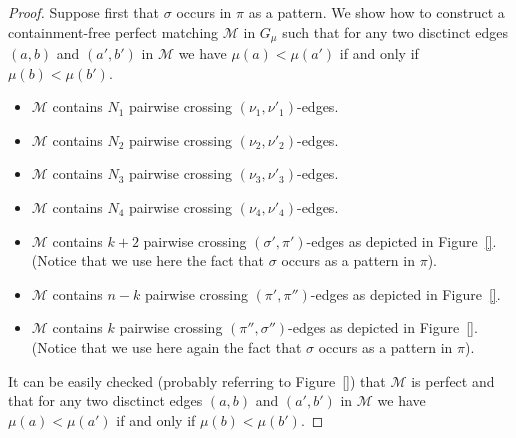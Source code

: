 \documentclass[a4paper]{llncs}
\begin{document}
\begin{proof}
  Suppose first that $\sigma$ occurs in $\pi$ as a pattern.
  We show how to construct a containment-free perfect matching
  $\mathcal{M}$ in $G_\mu$ such that
  for any two disctinct edges
  $(a, b)$ and $(a', b')$ in $\mathcal{M}$
  we have $\mu(a) < \mu(a')$ if and only if $\mu(b) < \mu(b')$.
  \begin{itemize}
    \item $\mathcal{M}$ contains $N_1$ pairwise crossing
    $(\nu_1, \nu'_1)$-edges.
    \item $\mathcal{M}$ contains $N_2$ pairwise crossing
    $(\nu_2, \nu'_2)$-edges.
    \item $\mathcal{M}$ contains $N_3$ pairwise crossing
    $(\nu_3, \nu'_3)$-edges.
    \item $\mathcal{M}$ contains $N_4$ pairwise crossing
    $(\nu_4, \nu'_4)$-edges.
    \item $\mathcal{M}$ contains $k+2$ pairwise crossing
    $(\sigma', \pi')$-edges as depicted in Figure~\ref{}.
    (Notice that we use here the fact that $\sigma$ occurs as a pattern in $\pi$).
    \item $\mathcal{M}$ contains $n-k$ pairwise crossing
    $(\pi', \pi'')$-edges as depicted in Figure~\ref{}.
    \item $\mathcal{M}$ contains $k$ pairwise crossing
    $(\pi'', \sigma'')$-edges as depicted in Figure~\ref{}.
    (Notice that we use here again the fact that $\sigma$ occurs as a pattern in $\pi$).
  \end{itemize}
  It can be easily checked (probably referring to Figure~\ref{}) that
  $\mathcal{M}$ is perfect and that
  for any two disctinct edges
  $(a, b)$ and $(a', b')$ in $\mathcal{M}$
  we have $\mu(a) < \mu(a')$ if and only if $\mu(b) < \mu(b')$.



\end{proof}
\end{document}
